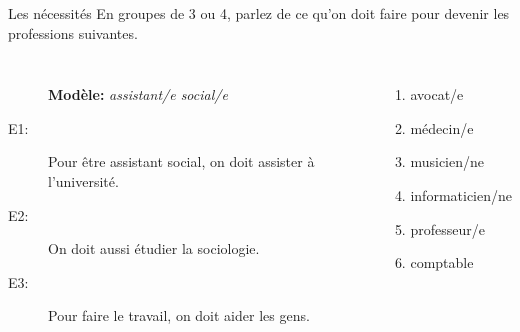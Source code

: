 \documentclass{beamer}
\begin{document}
  \begin{frame}{Les nécessités}
    En groupes de 3 ou 4, parlez de ce qu'on doit faire pour devenir les professions suivantes.\\
    \begin{columns}
        \begin{description}
          \item[] \textbf{Modèle:} \emph{assistant/e social/e}
          \item[E1:] Pour être assistant social, on doit assister à l'université.
          \item[] 
          \item[E2:] On doit aussi étudier la sociologie.
          \item[] 
          \item[E3:] Pour faire le travail, on doit aider les gens.
          \item[] 
        \end{description}
        \begin{enumerate}
          \item avocat/e
          \item médecin/e
          \item musicien/ne
          \item informaticien/ne
          \item professeur/e
          \item comptable
        \end{enumerate}
    \end{columns}
  \end{frame}
\end{document}
